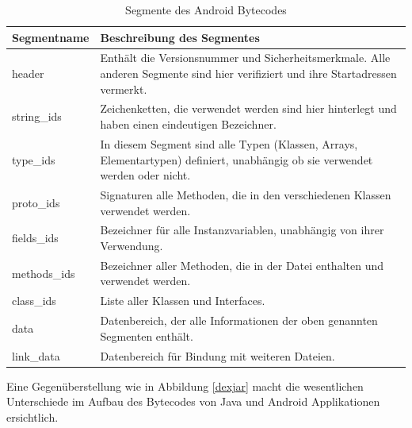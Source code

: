 \begin{table}[h!p]
\begin{tabular}{|p{3cm}|p{11cm}|}\hline

   \textbf{Segmentname} & \textbf{Beschreibung des Segmentes} \\ \hline

   header & Enthält die Versionsnummer und Sicherheitsmerkmale. Alle anderen Segmente sind hier verifiziert und ihre Startadressen vermerkt. \\ \hline

   string\_ids & Zeichenketten, die verwendet werden sind hier hinterlegt und haben einen eindeutigen Bezeichner. \\ \hline

   type\_ids & In diesem Segment sind alle Typen (Klassen, Arrays, Elementartypen) definiert, unabhängig ob sie verwendet werden oder nicht. \\ \hline

   proto\_ids & Signaturen alle Methoden, die in den verschiedenen Klassen verwendet werden. \\ \hline

   fields\_ids & Bezeichner für alle Instanzvariablen, unabhängig von ihrer Verwendung. \\ \hline

   methods\_ids & Bezeichner aller Methoden, die in der Datei enthalten und verwendet werden. \\ \hline

   class\_ids & Liste aller Klassen und Interfaces.\\ \hline

   data & Datenbereich, der alle Informationen der oben genannten Segmenten enthält.\\ \hline
   
   link\_data & Datenbereich für Bindung mit weiteren Dateien. \\ \hline
  
\end{tabular}
\caption{Segmente des Android Bytecodes \cite{eiddvm}}
\label{segand}
\end{table} 
 
 Eine Gegenüberstellung wie in Abbildung \ref{dexjar} macht die wesentlichen Unterschiede im Aufbau des Bytecodes von Java und Android Applikationen ersichtlich.
 
